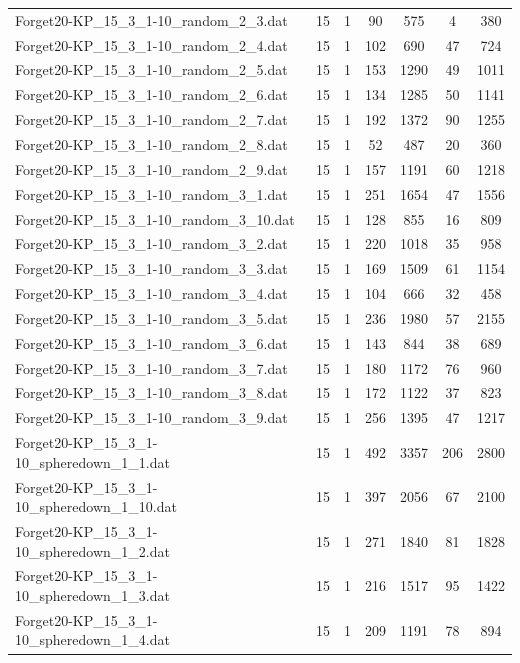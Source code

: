 \begin{table}[!ht]
\begin{tabular}{lcccccc}
Forget20-KP\_15\_3\_1-10\_random\_2\_3.dat & 15 & 1 & 90 & 575 & 4 & 380 \\
Forget20-KP\_15\_3\_1-10\_random\_2\_4.dat & 15 & 1 & 102 & 690 & 47 & 724 \\
Forget20-KP\_15\_3\_1-10\_random\_2\_5.dat & 15 & 1 & 153 & 1290 & 49 & 1011 \\
Forget20-KP\_15\_3\_1-10\_random\_2\_6.dat & 15 & 1 & 134 & 1285 & 50 & 1141 \\
Forget20-KP\_15\_3\_1-10\_random\_2\_7.dat & 15 & 1 & 192 & 1372 & 90 & 1255 \\
Forget20-KP\_15\_3\_1-10\_random\_2\_8.dat & 15 & 1 & 52 & 487 & 20 & 360 \\
Forget20-KP\_15\_3\_1-10\_random\_2\_9.dat & 15 & 1 & 157 & 1191 & 60 & 1218 \\
Forget20-KP\_15\_3\_1-10\_random\_3\_1.dat & 15 & 1 & 251 & 1654 & 47 & 1556 \\
Forget20-KP\_15\_3\_1-10\_random\_3\_10.dat & 15 & 1 & 128 & 855 & 16 & 809 \\
Forget20-KP\_15\_3\_1-10\_random\_3\_2.dat & 15 & 1 & 220 & 1018 & 35 & 958 \\
Forget20-KP\_15\_3\_1-10\_random\_3\_3.dat & 15 & 1 & 169 & 1509 & 61 & 1154 \\
Forget20-KP\_15\_3\_1-10\_random\_3\_4.dat & 15 & 1 & 104 & 666 & 32 & 458 \\
Forget20-KP\_15\_3\_1-10\_random\_3\_5.dat & 15 & 1 & 236 & 1980 & 57 & 2155 \\
Forget20-KP\_15\_3\_1-10\_random\_3\_6.dat & 15 & 1 & 143 & 844 & 38 & 689 \\
Forget20-KP\_15\_3\_1-10\_random\_3\_7.dat & 15 & 1 & 180 & 1172 & 76 & 960 \\
Forget20-KP\_15\_3\_1-10\_random\_3\_8.dat & 15 & 1 & 172 & 1122 & 37 & 823 \\
Forget20-KP\_15\_3\_1-10\_random\_3\_9.dat & 15 & 1 & 256 & 1395 & 47 & 1217 \\
Forget20-KP\_15\_3\_1-10\_spheredown\_1\_1.dat & 15 & 1 & 492 & 3357 & 206 & 2800 \\
Forget20-KP\_15\_3\_1-10\_spheredown\_1\_10.dat & 15 & 1 & 397 & 2056 & 67 & 2100 \\
Forget20-KP\_15\_3\_1-10\_spheredown\_1\_2.dat & 15 & 1 & 271 & 1840 & 81 & 1828 \\
Forget20-KP\_15\_3\_1-10\_spheredown\_1\_3.dat & 15 & 1 & 216 & 1517 & 95 & 1422 \\
Forget20-KP\_15\_3\_1-10\_spheredown\_1\_4.dat & 15 & 1 & 209 & 1191 & 78 & 894 \\

\end{tabular}
\end{table}
